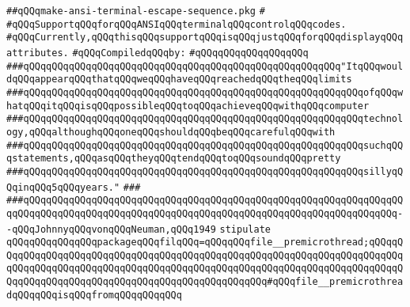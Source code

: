 \label{src/lib/src/make-ansi-terminal-escape-sequence.pkg}
\verb|##qQQqmake-ansi-terminal-escape-sequence.pkg|\newline
\verb|#|\newline
\verb|#qQQqSupportqQQqforqQQqANSIqQQqterminalqQQqcontrolqQQqcodes.|\newline
\verb|#qQQqCurrently,qQQqthisqQQqsupportqQQqisqQQqjustqQQqforqQQqdisplayqQQqattributes.|\newline
\newline
\verb|#qQQqCompiledqQQqby:|\newline
\verb|#qQQqqQQqqQQqqQQqqQQq|\newline
\newline
\newline
\verb|###qQQqqQQqqQQqqQQqqQQqqQQqqQQqqQQqqQQqqQQqqQQqqQQqqQQqqQQq"ItqQQqwouldqQQqappearqQQqthatqQQqweqQQqhaveqQQqreachedqQQqtheqQQqlimits|\newline
\verb|###qQQqqQQqqQQqqQQqqQQqqQQqqQQqqQQqqQQqqQQqqQQqqQQqqQQqqQQqqQQqofqQQqwhatqQQqitqQQqisqQQqpossibleqQQqtoqQQqachieveqQQqwithqQQqcomputer|\newline
\verb|###qQQqqQQqqQQqqQQqqQQqqQQqqQQqqQQqqQQqqQQqqQQqqQQqqQQqqQQqqQQqtechnology,qQQqalthoughqQQqoneqQQqshouldqQQqbeqQQqcarefulqQQqwith|\newline
\verb|###qQQqqQQqqQQqqQQqqQQqqQQqqQQqqQQqqQQqqQQqqQQqqQQqqQQqqQQqqQQqsuchqQQqstatements,qQQqasqQQqtheyqQQqtendqQQqtoqQQqsoundqQQqpretty|\newline
\verb|###qQQqqQQqqQQqqQQqqQQqqQQqqQQqqQQqqQQqqQQqqQQqqQQqqQQqqQQqqQQqsillyqQQqinqQQq5qQQqyears."|\newline
\verb|###|\newline
\verb|###qQQqqQQqqQQqqQQqqQQqqQQqqQQqqQQqqQQqqQQqqQQqqQQqqQQqqQQqqQQqqQQqqQQqqQQqqQQqqQQqqQQqqQQqqQQqqQQqqQQqqQQqqQQqqQQqqQQqqQQqqQQqqQQqqQQqqQQq--qQQqJohnnyqQQqvonqQQqNeuman,qQQq1949|\newline
\newline
\newline
\verb|stipulate|\newline
\verb|qQQqqQQqqQQqqQQqpackageqQQqfilqQQq=qQQqqQQqfile__premicrothread;qQQqqQQqqQQqqQQqqQQqqQQqqQQqqQQqqQQqqQQqqQQqqQQqqQQqqQQqqQQqqQQqqQQqqQQqqQQqqQQqqQQqqQQqqQQqqQQqqQQqqQQqqQQqqQQqqQQqqQQqqQQqqQQqqQQqqQQqqQQqqQQqqQQqqQQqqQQqqQQqqQQqqQQqqQQqqQQqqQQqqQQqqQQqqQQq#qQQqfile__premicrothreadqQQqqQQqisqQQqfromqQQqqQQqqQQq|\newline
